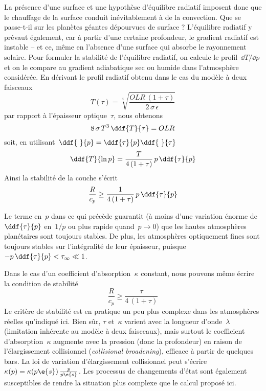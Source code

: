 \sk
La présence d'une surface et une hypothèse d'équilibre radiatif imposent donc que le chauffage de la surface conduit inévitablement à de la convection. Que se passe-t-il sur les planètes géantes dépourvues de surface ? L'équilibre radiatif y prévaut également, car à partir d'une certaine profondeur, le gradient radiatif est instable -- et ce, même en l'absence d'une surface qui absorbe le rayonnement solaire. Pour formuler la stabilité de l'équilibre radiatif, on calcule le profil~$\dd T / \dd p$ et on le compare au gradient adiabatique sec ou humide dans l'atmosphère considérée. En dérivant le profil radiatif obtenu dans le cas du modèle à deux faisceaux
\[ T(\tau) = \sqrt[4]{\frac{OLR\,(1+\tau)}{2\,\sigma\,\epsilon}} \]
\noindent par rapport à l'épaisseur optique~$\tau$, nous obtenons
\[ 8 \, \sigma \, T^3 \, \ddf{T}{\tau} = OLR \]
\noindent soit, en utilisant~$\ddf{~}{p} = \ddf{\tau}{p} \ddf{~}{\tau}$
\[ \ddf{T}{\ln p} = \frac{T}{4\,(1+\tau)} \, p \, \ddf{\tau}{p} \]
Ainsi la stabilité de la couche s'écrit
\[ \frac{R}{c_p} \ge \frac{1}{4\,(1+\tau)} \, p \, \ddf{\tau}{p} \]

\sk
Le terme en~$p$ dans ce qui précède guarantit (à moins d'une variation énorme de $\ddf{\tau}{p}$ en~$1/p$ ou plus rapide quand~$p \rightarrow 0$) que les hautes atmosphères planétaires sont toujours stables. De plus, les atmosphères optiquement fines sont toujours stables sur l'intégralité de leur épaisseur, puisque~$-p \, \ddf{\tau}{p} < \tau_\infty \ll 1$. 

\sk
Dans le cas d'un coefficient d'absorption~$\kappa$ constant, nous pouvons même écrire la condition de stabilité
\[ \frac{R}{c_p} \ge \frac{\tau}{4\,(1+\tau)} \]
\noindent Le critère de stabilité est en pratique un peu plus complexe dans les atmosphères réelles qu'indiqué ici. Bien sûr, $\tau$ et~$\kappa$ varient avec la longueur d'onde~$\lambda$ (limitation inhérente au modèle à deux faisceaux), mais surtout le coefficient d'absorption~$\kappa$ augmente avec la pression (donc la profondeur) en raison de l'élargissement collisionnel (\emph{collisional broadening}), efficace à partir de quelques bars. La loi de variation d'élargissement collisionnel peut s'écrire~$\kappa(p) = \kappa(p\e{s}) \, \frac{p}{p\e{s}}$. Les processus de changements d'état sont également susceptibles de rendre la situation plus complexe que le calcul proposé ici.
